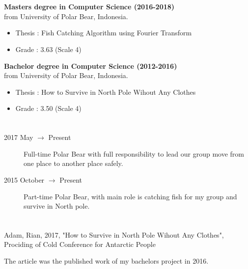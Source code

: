 \documentclass[margin,line,a4paper]{resume}
\begin{document}
\begin{resume}
    \section{} 
    
    \textbf{Masters degree in Computer Science (2016-2018)} \\
    from University of Polar Bear, Indonesia.
    \begin{itemize}
        \item {Thesis} : Fish Catching Algorithm using Fourier Transform
        \item {Grade} : 3.63 (Scale 4)
    \end{itemize}
    
     \textbf{Bachelor degree in Computer Science (2012-2016)} \\
    from University of Polar Bear, Indonesia.
    \begin{itemize}
        \item {Thesis} : How to Survive in North Pole Wihout Any Clothes
        \item {Grade} : 3.50 (Scale 4)
    \end{itemize}

\section{}\vspace{1mm}
\begin{description}
    
    \item[2017 May $\rightarrow$ Present] Full-time Polar Bear with full responsibility to lead our group move from one place to another place safely.
    \item[2015 October $\rightarrow$ Present] Part-time Polar Bear, with main role is catching fish for my group and survive in North pole.
 
\end{description}


\section{}

    Adam, Rian, 2017, "How to Survive in North Pole Wihout Any Clothes", Prociding of Cold Conference for Antarctic People
    
    The article was the published work of my bachelors project in 2016. 


\end{resume}
\end{document}
